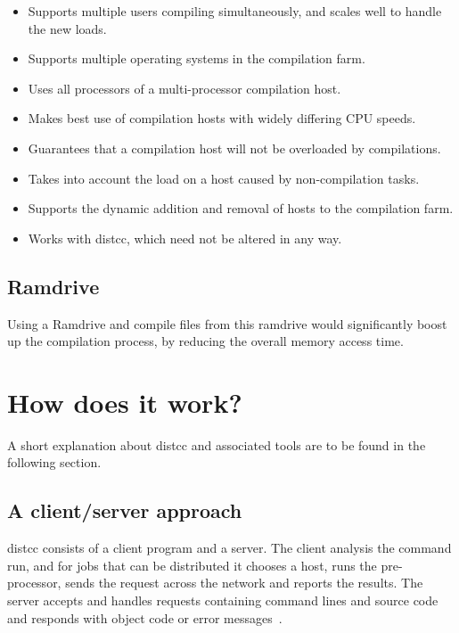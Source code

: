 \documentclass{article}
\begin{document}
\begin{itemize}
	\item Supports multiple users compiling simultaneously, and scales well to handle the new loads.
	\item Supports multiple operating systems in the compilation farm.
	\item Uses all processors of a multi-processor compilation host.
	\item Makes best use of compilation hosts with widely differing CPU speeds.
	\item Guarantees that a compilation host will not be overloaded by
	compilations. 
	\item Takes into account the load on a host caused by non-compilation tasks.
	\item Supports the dynamic addition and removal of hosts to the compilation farm.
	\item Works with distcc, which need not be altered in any way.
\end{itemize} %

\subsection{Ramdrive}
Using a Ramdrive and compile files from this ramdrive would significantly boost
up the compilation process, by reducing the overall memory access time.

\section{How does it work?}
A short explanation about distcc and associated tools are to be found in the
following section.

\subsection{A client/server approach}

distcc consists of a client program and a server. The client analysis the
command run, and for jobs that can be distributed it chooses a host, runs the
pre-processor, sends the request across the network and reports the results. The
server accepts and handles requests containing command lines and source code
and responds with object code or error messages~\cite{lca2004}. 
\end{document}
